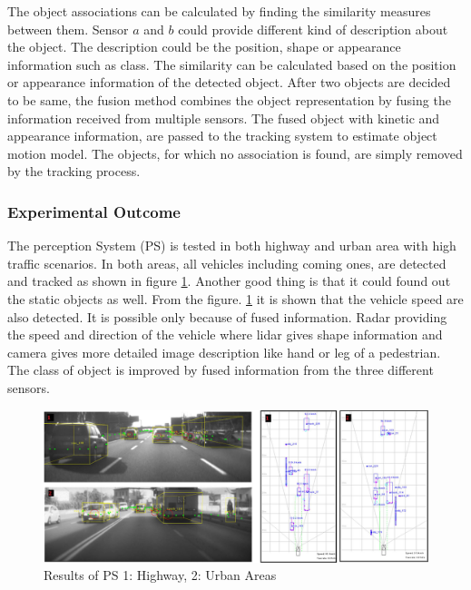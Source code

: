 The object associations can be calculated by finding the similarity measures between them. Sensor $a$ and $b$ could provide different kind of description about the object. The description could be the position, shape or appearance information such as class. The similarity can be calculated based on the position or appearance information of the detected object. After two objects are decided to be same, the fusion method combines the object representation by fusing the information received from multiple sensors\cite{Chavez_Garcia_2016}. The fused object with kinetic and appearance information, are passed to the tracking system to estimate object motion model. The objects, for which no association is found, are simply removed by the tracking process.

\subsubsection{Experimental Outcome}
The perception System (PS) is tested in both highway and urban area with high traffic scenarios. In both areas, all vehicles including coming ones, are detected and tracked\cite{Chavez_Garcia_2016} as shown in figure \ref{fig:Experimental_PS}. Another good thing is that it could found out the static objects as well. From the figure. \ref{fig:Experimental_PS} it is shown that the vehicle speed are also detected. It is possible only because of fused information. Radar providing the speed and direction of the vehicle where lidar gives shape information and camera gives more detailed image description like hand or leg of a pedestrian. The class of object is improved by fused information from the three different sensors.
\begin{figure}
  \centering
  \includegraphics[width=1\textwidth]{src/pic/Experimental_PS.png}
  \caption{Results of PS 1: Highway, 2: Urban Areas \cite{Chavez_Garcia_2016}}
  \label{fig:Experimental_PS}
\end{figure}

